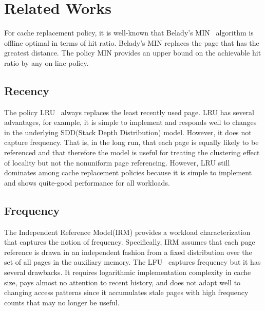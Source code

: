 \vspace{0.2cm}
\section{Related Works}

For cache replacement policy, it is well-known that Belady's MIN~\cite{belady} algorithm is offline optimal in terms of hit ratio. Belady's MIN replaces the page that has the greatest distance. The policy MIN provides an upper bound on the achievable hit ratio by any on-line policy.

\subsection{Recency}
The policy LRU~\cite{lru} always replaces the least recently used page. LRU has several advantages, for example, it is simple to implement and responds well to changes in the underlying SDD(Stack Depth Distribution) model. However, it does not capture frequency. That is, in the long run, that each page is equally likely to be referenced and that therefore the model is useful for treating the clustering effect of locality but not the nonuniform page referencing. However, LRU still dominates among cache replacement policies because it is simple to implement and shows quite-good performance for all workloads.


\subsection{Frequency}
The Independent Reference Model(IRM) provides a workload characterization that captures the notion of frequency. Specifically, IRM assumes that each page reference is drawn in an independent fashion from a fixed distribution over the set of all pages in the auxiliary memory. The LFU~\cite{lru} captures frequency but it has several drawbacks. It requires logarithmic implementation complexity in cache size, pays almost no attention to recent history, and does not adapt well to changing access patterns since it accumulates stale pages with high frequency counts that may no longer be useful.

